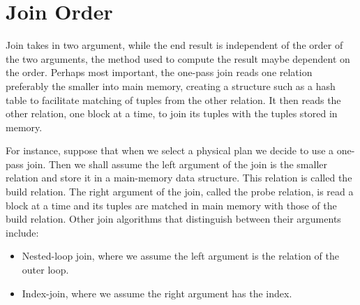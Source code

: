 \section{Join Order}
Join takes in two argument, while the end result is independent of the order of the two arguments, the method used to compute the result maybe dependent on the order. Perhaps most important, the one-pass join reads one relation preferably the smaller
into main memory, creating a structure such as a hash table to facilitate matching of tuples from the other relation. It then reads the other relation, one block at a time, to join its tuples with the tuples stored in memory. 
\par For instance, suppose that when we select a physical plan we decide to use a one-pass join. Then we shall assume the left argument of the join is the smaller relation and store it in a main-memory data structure. This relation is called the build relation. The right argument of the join, called the probe relation, is read a block at a time and its tuples are matched in main memory with those of the build relation. Other join algorithms that distinguish between their arguments include:
\begin{itemize}
    \item Nested-loop join, where we assume the left argument is the relation of the
outer loop.
    \item Index-join, where we assume the right argument has the index.
\end{itemize}

